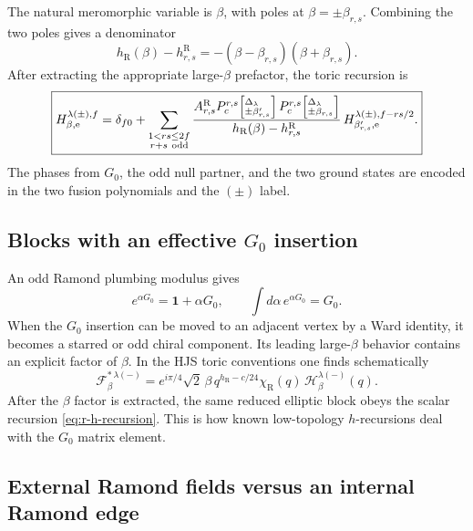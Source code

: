 \documentclass[11pt]{article}
\newcommand{\R}{\mathrm{R}}
\newcommand{\F}{\mathcal F}
\newcommand{\Hh}{\mathcal H}
\newcommand{\id}{\mathbf 1}
\begin{document}
The natural meromorphic variable is \(\beta\), with poles at
\(\beta=\pm\beta_{r,s}\).  Combining the two poles gives a denominator
\begin{equation}
 h_\R(\beta)-h^\R_{r,s}
 =
 -(\beta-\beta_{r,s})(\beta+\beta_{r,s}).
 \label{eq:r-paired-poles}
\end{equation}
After extracting the appropriate large-\(\beta\) prefactor, the toric
recursion is
\begin{equation}
 \boxed{
 H_{\beta,\mathrm e}^{\lambda(\pm),f}
 =
 \delta_{f0}
 +
 \sum_{\substack{1<rs\le2f\\r+s\ {\rm odd}}}
 \frac{
 A^\R_{r,s}
 P^{r,s}_{c}\!\left[{}^{\Delta_\lambda}_{\pm\beta'_{r,s}}\right]
 P^{r,s}_{c}\!\left[{}^{\Delta_\lambda}_{\pm\beta_{r,s}}\right]}
 {h_\R(\beta)-h^\R_{r,s}}\,
 H_{\beta'_{r,s},\mathrm e}^{\lambda(\pm),f-rs/2}.}
 \label{eq:r-h-recursion}
\end{equation}
The phases from \(G_0\), the odd null partner, and the two ground states are
encoded in the two fusion polynomials and the \((\pm)\) label.

\subsection{\texorpdfstring{Blocks with an effective \(G_0\) insertion}
{Blocks with an effective G0 insertion}}

An odd Ramond plumbing modulus gives
\begin{equation}
 e^{\alpha G_0}=\id+\alpha G_0,
 \qquad
 \int d\alpha\,e^{\alpha G_0}=G_0.
 \label{eq:r-odd-sewing}
\end{equation}
When the \(G_0\) insertion can be moved to an adjacent vertex by a Ward
identity, it becomes a starred or odd chiral component.  Its leading
large-\(\beta\) behavior contains an explicit factor of \(\beta\).  In the
HJS toric conventions one finds schematically
\begin{equation}
 \F_{\beta}^{*\,\lambda(-)}
 =
 e^{i\pi/4}\sqrt2\,\beta\,
 q^{h_\R-c/24}
 \chi_\R(q)\,
 \Hh_{\beta}^{\lambda(-)}(q).
 \label{eq:r-g0-prefactor}
\end{equation}
After the \(\beta\) factor is extracted, the same reduced elliptic block
obeys the scalar recursion \eqref{eq:r-h-recursion}.  This is how known
low-topology \(h\)-recursions deal with the \(G_0\) matrix element.

\subsection{External Ramond fields versus an internal Ramond edge}
\end{document}
